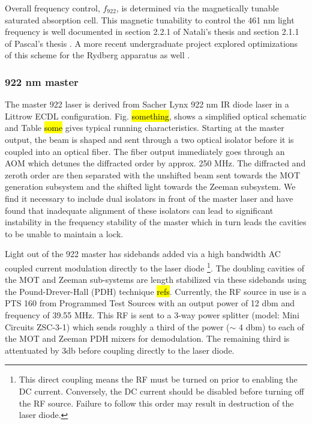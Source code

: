 Overall frequency control, $f_{922}$, is determined via the magnetically tunable saturated absorption cell.
This magnetic tunability to control the 461 nm light frequency is well documented in section 2.2.1 of Natali's thesis \cite{MartinezdeEscolar2010} and section 2.1.1 of Pascal's thesis \cite{Mickelson2010b}.
A more recent undergraduate project explored optimizations of this scheme for the Rydberg apparatus as well \cite{MichaelViray2014}.

\subsubsection{922 nm master}
The master 922 laser is derived from Sacher Lynx 922 nm IR diode laser in a Littrow ECDL configuration.
Fig. \hl{something}, shows a simplified optical schematic and Table \hl{some} gives typical running characteristics.
Starting at the master output, the beam is shaped and sent through a two optical isolator before it is coupled into an optical fiber.
The fiber output immediately goes through an AOM which detunes the diffracted order by approx. 250 MHz.
The diffracted and zeroth order are then separated with the unshifted beam sent towards the MOT generation subsystem and the shifted light towards the Zeeman subsystem.
We find it necessary to include dual isolators in front of the master laser and have found that inadequate alignment of these isolators can lead to significant instability in the frequency stability of the master which in turn leads the cavities to be unable to maintain a lock.

Light out of the 922 master has sidebands added via a high bandwidth AC coupled current modulation directly to the laser diode 
\footnote{This direct coupling means the RF must be turned on prior to enabling the DC current. 
Conversely, the DC current should be disabled before turning off the RF source. 
Failure to follow this order may result in destruction of the laser diode.}.
The doubling cavities of the MOT and Zeeman sub-systems are length stabilized via these sidebands using the Pound-Drever-Hall (PDH) technique \hl{refs}.
Currently, the RF source in use is a PTS 160 from Programmed Test Sources with an output power of 12 dbm and frequency of 39.55 MHz.
This RF is sent to a 3-way power splitter (model: Mini Circuits ZSC-3-1) which sends roughly a third of the power ($\sim$ 4 dbm) to each of the MOT and Zeeman PDH mixers for demodulation. 
The remaining third is attentuated by 3db before coupling directly to the laser diode.

